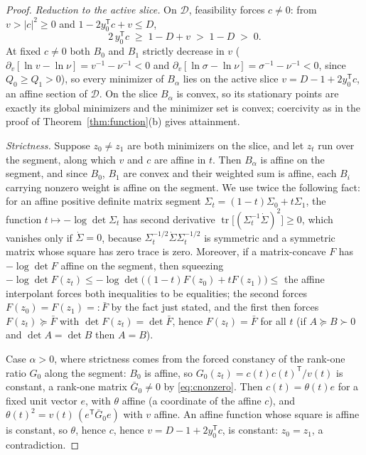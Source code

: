 \documentclass[11pt,onecolumn]{IEEEtran}
\newcommand{\tr}{\operatorname{tr}}
\begin{document}
\begin{proof}
\emph{Reduction to the active slice.} On $\mathcal D$, feasibility
forces $c\ne0$: from $v>|c|^2\ge0$ and
$1-2y_0^{\mathsf T}c+v\le D$,
\begin{equation}
2\,y_0^{\mathsf T}c\;\ge\;1-D+v\;>\;1-D\;>\;0 .
\label{eq:cnonzero}
\end{equation}
At fixed $c\ne0$ both $B_0$ and $B_1$ strictly decrease in $v$
($\partial_v[\ln v-\ln \nu]=v^{-1}-\nu^{-1}<0$ and
$\partial_v[\ln\sigma-\ln \nu]=\sigma^{-1}-\nu^{-1}<0$, since
$Q_0\ge Q_1>0$), so every minimizer of $B_\alpha$ lies on the active
slice $v=D-1+2y_0^{\mathsf T}c$, an affine section of $\mathcal D$. On
the slice $B_\alpha$ is convex, so its stationary points are exactly
its global minimizers and the minimizer set is convex; coercivity as
in the proof of Theorem~\ref{thm:function}(b) gives attainment.

\emph{Strictness.} Suppose $z_0\ne z_1$ are both minimizers on the
slice, and let $z_t$ run over the segment, along which $v$ and $c$ are
affine in $t$. Then $B_\alpha$ is affine on the segment, and since
$B_0$, $B_1$ are convex and their weighted sum is affine, each $B_i$
carrying nonzero weight is affine on the segment. We use twice the
following fact: for an affine positive definite matrix segment
$\Sigma_t=(1-t)\Sigma_0+t\Sigma_1$, the function
$t\mapsto-\log\det\Sigma_t$ has second derivative
$\tr\bigl[(\Sigma_t^{-1}\dot\Sigma)^2\bigr]\ge0$, which vanishes only
if $\dot\Sigma=0$, because
$\Sigma_t^{-1/2}\dot\Sigma\Sigma_t^{-1/2}$ is symmetric and a
symmetric matrix whose square has zero trace is zero. Moreover, if a
matrix-concave $F$ has $-\log\det F$ affine on the segment, then
squeezing
$-\log\det F(z_t)\le-\log\det\bigl((1-t)F(z_0)+tF(z_1)\bigr)\le$
the affine interpolant forces both inequalities to be equalities;
the second forces $F(z_0)=F(z_1)=:\bar F$ by the fact just stated,
and the first then forces $F(z_t)\succeq\bar F$ with
$\det F(z_t)=\det\bar F$, hence $F(z_t)=\bar F$ for all $t$
(if $A\succeq B\succ0$ and $\det A=\det B$ then $A=B$).

Case $\alpha>0$, where strictness comes from the forced constancy of
the rank-one ratio $G_0$ along the segment: $B_0$ is affine, so
$G_0(z_t)=c(t)c(t)^{\mathsf T}/v(t)$ is constant, a rank-one matrix
$\bar G_0\ne0$ by \eqref{eq:cnonzero}. Then $c(t)=\theta(t)e$ for a fixed unit vector
$e$, with $\theta$ affine (a coordinate of the affine $c$), and
$\theta(t)^2=v(t)\,(e^{\mathsf T}\bar G_0e)$ with $v$ affine. An
affine function whose square is affine is constant, so $\theta$, hence
$c$, hence $v=D-1+2y_0^{\mathsf T}c$, is constant: $z_0=z_1$, a
contradiction.


\end{proof}
\end{document}
